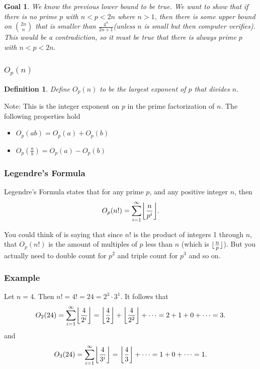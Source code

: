 \documentclass{beamer}
\newtheorem{goal}{Goal}
\newtheorem{defi}{Definition}
\DeclarePairedDelimiter\floor{\lfloor}{\rfloor}
\DeclarePairedDelimiter\bigfloor{\bigg\lfloor}{\bigg\rfloor}
\begin{document}
\begin{frame}
\begin{goal}
\normalfont We know the previous lower bound to be true. We want to show that if there is no prime $p$ with $n < p < 2n$ where $n > 1$, then there is some upper bound on ${2n \choose n}$ that is smaller than $\frac{4^n}{2n+1}$(unless $n$ is small but then computer verifies). This would be a contradiction, so it must be true that there is always prime $p$ with $n < p < 2n.$
\end{goal}
\end{frame}

\begin{frame}
\frametitle{$O_p(n)$}
\begin{defi}
\normalfont Define $O_p(n)$ to be the largest exponent of $p$ that divides $n$.
\end{defi}
\pause
Note: This is the integer exponent on $p$ in the prime factorization of $n$.
\pause
The following properties hold
\pause
\begin{itemize}
\item $O_p(ab) = O_p(a) + O_p(b)$
\pause
\item $O_p\left(\frac{a}{b}\right) = O_p(a) - O_p(b)$
\end{itemize}
\end{frame}

\begin{frame}
\frametitle{Legendre's Formula}
\begin{corollary}[1]
\normalfont Legendre's Formula states that for any prime $p$, and any positive integer $n$, then
$$O_p(n!) = \sum_{i = 1}^{\infty} \bigfloor{\frac{n}{p^i}}.$$
\end{corollary}
\pause
You could think of is saying that since $n!$ is the product of integers 1 through $n$, that $O_p(n!)$ is the amount of multiples of $p$ less than $n$ (which is $\floor{\frac{n}{p}}$). But you actually need to double count for $p^2$ and triple count for $p^3$ and so on.
\end{frame}

\begin{frame}
\frametitle{Example}
Let $n =4$. Then $n! = 4! = 24 = 2^3 \cdot 3^1.$ It follows that
$$O_2(24) = \sum_{i = 1}^{\infty} \bigfloor{\frac{4}{2^i}} = \bigfloor{\frac{4}{2}} + \bigfloor{\frac{4}{2^2}} + \cdots = 2 + 1 + 0 + \cdots = 3.$$
and
\pause
$$O_3(24) = \sum_{i=1}^{\infty} \bigfloor{\frac{4}{3^i}} =\bigfloor{\frac{4}{3}} + \cdots = 1 + 0 + \cdots = 1.$$
\end{frame}
\end{document}
